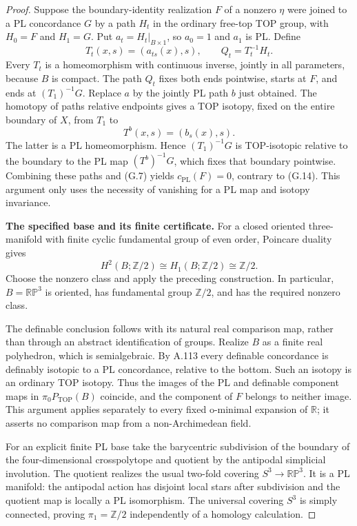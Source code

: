 \begin{proof}
Suppose the boundary-identity realization $F$ of a nonzero $\eta$ were
joined to a PL concordance $G$ by a path $H_t$ in the ordinary
free-top TOP group, with $H_0=F$ and $H_1=G$. Put
$a_t=H_t|_{B\times1}$, so $a_0=1$ and $a_1$ is PL. Define
\[
 T_t(x,s)=(a_{ts}(x),s),\qquad Q_t=T_t^{-1}H_t.
                                                        \tag{G.16}
\]
Every $T_t$ is a homeomorphism with continuous inverse, jointly in all
parameters, because $B$ is compact. The path $Q_t$ fixes both ends
pointwise, starts at $F$, and ends at $(T_1)^{-1}G$.
Replace $a$ by the jointly PL path $b$ just obtained. The homotopy of
paths relative endpoints gives a TOP isotopy, fixed on the entire
boundary of $X$, from $T_1$ to
\[
                       T^b(x,s)=(b_s(x),s).
                                                        \tag{G.17}
\]
The latter is a PL homeomorphism. Hence $(T_1)^{-1}G$ is TOP-isotopic
relative to the boundary to the PL map $(T^b)^{-1}G$, which fixes that
boundary pointwise. Combining these paths and (G.7) yields
$c_{\mathrm{PL}}(F)=0$, contrary to (G.14). This argument only uses the
necessity of vanishing for a PL map and isotopy invariance.

\textbf{The specified base and its finite certificate.}
For a closed oriented three-manifold with finite cyclic fundamental
group of even order, Poincare duality gives
\[
 H^2(B;\mathbb Z/2)\cong H_1(B;\mathbb Z/2)\cong\mathbb Z/2.
                                                        \tag{G.18}
\]
Choose the nonzero class and apply the preceding construction. In
particular, $B=\mathbb {RP}^3$ is oriented, has fundamental group
$\mathbb Z/2$, and has the required nonzero class.

The definable conclusion follows with its natural real comparison
map, rather than through an abstract identification of groups. Realize
$B$ as a finite real polyhedron, which is semialgebraic. By A.113 every
definable concordance is definably isotopic to a PL concordance, relative
to the bottom. Such an isotopy is an ordinary TOP isotopy. Thus the
images of the PL and definable component maps in $\pi_0P_{\mathrm{TOP}}(B)$
coincide, and the component of $F$ belongs to neither image. This
argument applies separately to every fixed o-minimal expansion of
$\mathbb R$; it asserts no comparison map from a non-Archimedean field.

For an explicit finite PL base take the barycentric subdivision of
the boundary of the four-dimensional crosspolytope and quotient by
the antipodal simplicial involution. The quotient realizes the usual
two-fold covering $S^3\to\mathbb {RP}^3$. It is a PL manifold: the
antipodal action has disjoint local stars after subdivision and the
quotient map is locally a PL isomorphism. The universal covering
$S^3$ is simply connected, proving $\pi_1=\mathbb Z/2$ independently
of a homology calculation.


\end{proof}
